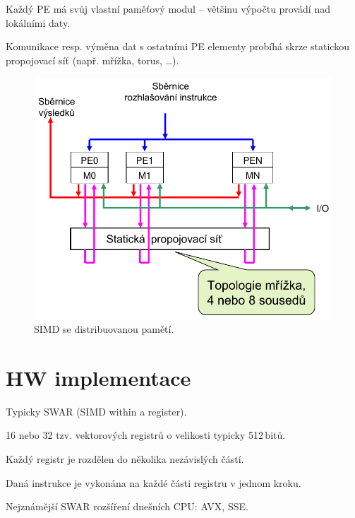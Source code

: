 \begin{compactitem}
    \item Každý PE má svůj vlastní paměťový modul -- většinu výpočtu provádí nad lokálními daty.
    \item Komunikace resp. výměna dat s ostatními PE elementy probíhá skrze statickou propojovací síť (např. mřížka, torus, \ldots).

    \begin{figure}[H]
        \centering
        \includegraphics[width=0.75\linewidth]{simd_distribuovana.pdf}
        \caption{SIMD se distribuovanou pamětí.}
    \end{figure}
\end{compactitem}


\section{HW implementace}

\begin{compactitem}
    \item Typicky SWAR (SIMD within a register).

    \item 16 nebo 32 tzv. vektorových registrů o velikosti typicky 512\,bitů.

    \item Každý registr je rozdělen do několika nezávislých částí.

    \item Daná instrukce je vykonána na každé části registru v jednom kroku.

    \item Nejznámější SWAR rozšíření dnešních CPU: AVX, SSE.
\end{compactitem}

